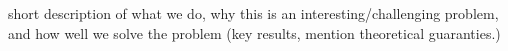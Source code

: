 % 


short description of what we do, why this is an interesting/challenging problem, and how well we solve the problem (key results, mention theoretical guaranties.)